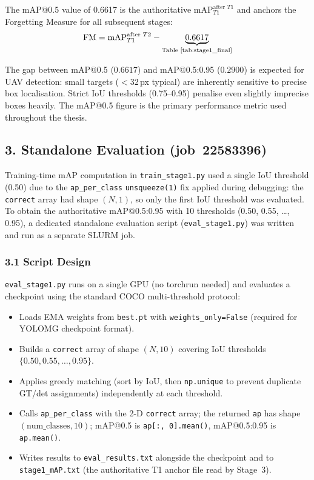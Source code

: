 \noindent The mAP@0.5 value of 0.6617 is the authoritative
$\text{mAP}_{T1}^{\text{after }T1}$ and anchors the Forgetting
Measure for all subsequent stages:
\[
    \text{FM} = \text{mAP}_{T1}^{\text{after }T2}
              - \underbrace{0.6617}_{\text{Table~\ref{tab:stage1_final}}}
\]

\noindent The gap between mAP@0.5 ($0.6617$) and mAP@0.5:0.95
($0.2900$) is expected for UAV detection: small targets
($<$32\,px typical) are inherently sensitive to precise box
localisation. Strict IoU thresholds (0.75--0.95) penalise even
slightly imprecise boxes heavily. The mAP@0.5 figure is the
primary performance metric used throughout the thesis.

\subsection*{3. Standalone Evaluation (job~22583396)}

Training-time mAP computation in \texttt{train\_stage1.py} used a
single IoU threshold (0.50) due to the \texttt{ap\_per\_class}
\texttt{unsqueeze(1)} fix applied during debugging: the
\texttt{correct} array had shape $(N, 1)$, so only the first IoU
threshold was evaluated. To obtain the authoritative
mAP@0.5:0.95 with 10 thresholds (0.50, 0.55, \ldots, 0.95),
a dedicated standalone evaluation script (\texttt{eval\_stage1.py})
was written and run as a separate SLURM job.

\subsubsection*{3.1 Script Design}

\texttt{eval\_stage1.py} runs on a single GPU (no torchrun needed)
and evaluates a checkpoint using the standard COCO multi-threshold
protocol:
\begin{itemize}
    \item Loads EMA weights from \texttt{best.pt} with
          \texttt{weights\_only=False} (required for YOLOMG
          checkpoint format).
    \item Builds a \texttt{correct} array of shape $(N, 10)$
          covering IoU thresholds $\{0.50, 0.55, \ldots, 0.95\}$.
    \item Applies greedy matching (sort by IoU, then
          \texttt{np.unique} to prevent duplicate GT/det
          assignments) independently at each threshold.
    \item Calls \texttt{ap\_per\_class} with the 2-D
          \texttt{correct} array; the returned \texttt{ap} has
          shape $(\text{num\_classes}, 10)$; mAP@0.5 is
          \texttt{ap[:, 0].mean()}, mAP@0.5:0.95 is
          \texttt{ap.mean()}.
    \item Writes results to \texttt{eval\_results.txt} alongside
          the checkpoint and to \texttt{stage1\_mAP.txt} (the
          authoritative T1 anchor file read by Stage~3).
\end{itemize}

